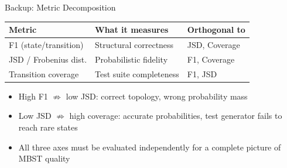 \documentclass[aspectratio=169,10pt]{beamer}
\begin{document}
\begin{frame}{Backup: Metric Decomposition}
  \begin{center}
  \begin{tabular}{l l l}
    \toprule
    \textbf{Metric} & \textbf{What it measures} & \textbf{Orthogonal to} \\
    \midrule
    F1 (state/transition) & Structural correctness & JSD, Coverage \\
    JSD / Frobenius dist. & Probabilistic fidelity & F1, Coverage \\
    Transition coverage & Test suite completeness & F1, JSD \\
    \bottomrule
  \end{tabular}
  \end{center}
  \vspace{0.5em}
  \begin{itemize}
    \item High F1 $\not\Rightarrow$ low JSD: correct topology, wrong probability mass
    \item Low JSD $\not\Rightarrow$ high coverage: accurate probabilities, test generator fails to reach rare states
    \item All three axes must be evaluated independently for a complete picture of MBST quality
  \end{itemize}
\end{frame}
\end{document}
